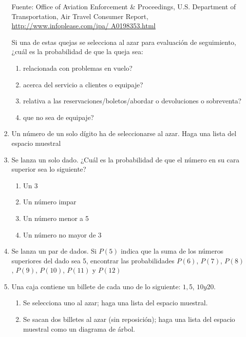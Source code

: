 \documentclass[11pt,twoside]{article}
\begin{document}
\begin{enumerate}
\begin{table}[!h]
\caption{Fuente: Office of Aviation Enforcement \& Proceedings, U.S. Department of
Transportation, Air Travel Consumer Report, \url{http://www.infoplease.com/ipa/
A0198353.html}}
\end{table} 
Si una de estas quejas se selecciona al azar para evaluación de seguimiento, ¿cuál es la probabilidad de que la queja sea:
\begin{enumerate}
 \item relacionada con problemas en vuelo?
 \item acerca del servicio a clientes o equipaje?
 \item relativa a las reservaciones/boletos/abordar o devoluciones o sobreventa?
 \item que no sea de equipaje?
\end{enumerate}
\item Un número de un solo dígito ha de seleccionarse al azar. Haga una lista del espacio muestral
\item Se lanza un solo dado. ¿Cuál es la probabilidad de que el número en su cara superior sea lo siguiente?
\begin{enumerate}
 \item Un 3
 \item Un número impar
 \item Un número menor a 5
 \item Un número no mayor de 3
\end{enumerate}
\item Se lanza un par de dados. Si $P(5)$ indica que la suma de los números superiores del dado sea 5, encontrar las probabilidades $P(6)$, $P(7)$, $P(8)$, $P(9)$, $P(10)$, $P(11)$ y $P(12)$
\item  Una caja contiene un billete de cada uno de lo
siguiente: $1, $5, $10 y $20.
\begin{enumerate}
 \item Se selecciona uno al azar; haga una lista del espacio muestral.
 \item Se sacan dos billetes al azar (sin reposición); haga una lista del espacio muestral como un diagrama de árbol.
\end{enumerate}
 \end{enumerate}
\end{document}
